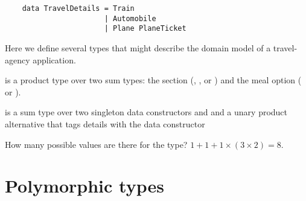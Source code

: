 \begin{notelist}
\begin{notelist}
\begin{lstlisting}
    data TravelDetails = Train
                       | Automobile
                       | Plane PlaneTicket
    \end{lstlisting}
    \begin{notelist}
        \item Here we define several types that might describe the domain model of a travel-agency application.
        \item {} is a product type over two sum types: the section (, ,
              or ) and the meal option ( or ).
        \item {} is a sum type over two singleton data constructors  and  and a unary
              product alternative that tags  details with the data constructor 
        \item How many possible values are there for the  type? $1 + 1 + 1 \times (3 \times 2) = 8$.
    \end{notelist}
\end{notelist}
\end{notelist}

\section{Polymorphic types}

